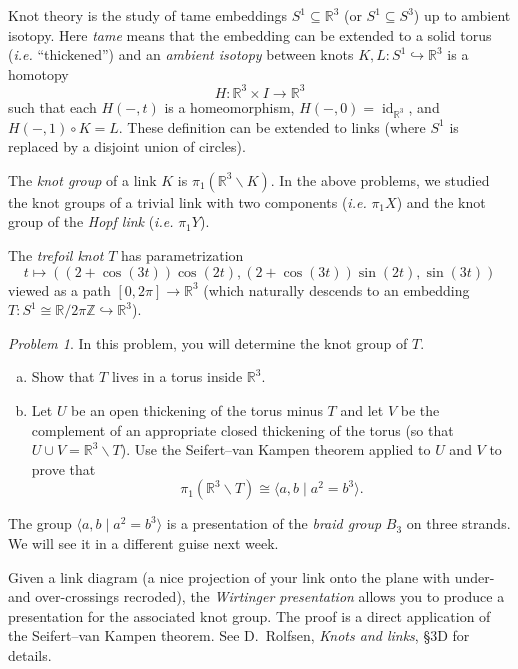 \documentclass[11pt,twoside]{amsart}
\theoremstyle{plain}
\theoremstyle{remark}
\newtheorem{prob}{Problem}
\theoremstyle{definition}
\theoremstyle{definition}
\newcommand{\RR}{\mathbb{R}}
\newcommand{\ZZ}{\mathbb{Z}}
\newcommand{\id}{\operatorname{id}}
\begin{document}
\hrulefill
\bigskip

Knot theory is the study of tame embeddings $S^1\subseteq \RR^3$ (or $S^1\subseteq S^3$) up to ambient isotopy. Here \emph{tame} means that the embedding can be extended to a solid torus (\emph{i.e.} ``thickened'') and an \emph{ambient isotopy} between knots $K,L\colon S^1\hookrightarrow \RR^3$ is a homotopy
\[
  H\colon \RR^3\times I\to \RR^3
\]
such that each $H(-,t)$ is a homeomorphism, $H(-,0) = \id_{\RR^3}$, and $H(-,1)\circ K = L$. These definition can be extended to links (where $S^1$ is replaced by a disjoint union of circles).

The \emph{knot group} of a link $K$ is $\pi_1(\RR^3\smallsetminus K)$. In the above problems, we studied the knot groups of a trivial link with two components (\emph{i.e.} $\pi_1X$) and the knot group of the \emph{Hopf link} (\emph{i.e.} $\pi_1Y$).

The \emph{trefoil knot} $T$ has parametrization
\[
  t\longmapsto ((2+\cos(3t))\cos(2t),(2+\cos(3t))\sin(2t),\sin(3t))
\]
viewed as a path $[0,2\pi]\to \RR^3$ (which naturally descends to an embedding $T\colon S^1\cong \RR/2\pi\ZZ\hookrightarrow \RR^3$).

\begin{prob}
In this problem, you will determine the knot group of $T$.
\begin{enumerate}[(a)]
\item Show that $T$ lives in a torus inside $\RR^3$.
\item Let $U$ be an open thickening of the torus minus $T$ and let $V$ be the complement of an appropriate closed thickening of the torus (so that $U\cup V = \RR^3\smallsetminus T$). Use the Seifert--van Kampen theorem applied to $U$ and $V$ to prove that
\[
  \pi_1(\RR^3\smallsetminus T) \cong \langle a,b\mid a^2=b^3\rangle.
\]

\end{enumerate}
\end{prob}

\hrulefill
\bigskip

The group $\langle a,b\mid a^2=b^3\rangle$ is a presentation of the \emph{braid group} $B_3$ on three strands. We will see it in a different guise next week.

Given a link diagram (a nice projection of your link onto the plane with under- and over-crossings recroded), the \emph{Wirtinger presentation} allows you to produce a presentation for the associated knot group. The proof is a direct application of the Seifert--van Kampen theorem. See D.~Rolfsen, \emph{Knots and links}, \S 3D for details.
\end{document}
